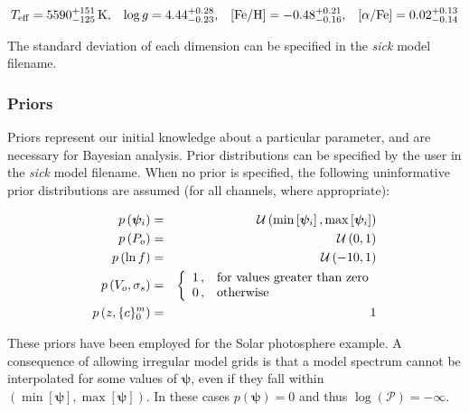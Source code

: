 \documentclass{aastex}
\newcommand{\sick}{\textit{sick}}
\begin{document}

\begin{eqnarray}
T_{\rm eff} = 5590_{-125}^{+151}\,\mbox{K},\,\,\,\,\, \log{g} = 4.44_{-0.23}^{+0.28},\,\,\,\,\, [\mbox{Fe/H}] = -0.48_{-0.16}^{+0.21},\,\,\,\,\, [\alpha/\mbox{Fe}] = 0.02_{-0.14}^{+0.13} \\
\end{eqnarray}

The standard deviation of each dimension can be specified in the \sick{} model filename.

\subsubsection{Priors}
\label{sec:priors}

Priors represent our initial knowledge about a particular parameter, and are necessary for Bayesian analysis. Prior distributions can be specified by the user in the \sick{} model filename. When no prior is specified, the following uninformative prior distributions are assumed (for all channels, where appropriate):

\begin{eqnarray}
p\left(\bm{\psi}_i\right) &=& \mathcal{U}\left(\min\left[\bm{\psi}_i\right], \max\left[\bm{\psi}_i\right]\right) \\
p\left(P_o\right) &=& \mathcal{U}\left(0, 1\right) \\
p\left(\ln{f}\right) &=& \mathcal{U}\left(-10, 1\right) \\
p\left(V_o,\sigma_s\right) &=& \left\{
\begin{array}{c l}      
    1\,, &\mbox{for values greater than zero}\\
    0\,, &\mbox{otherwise}
\end{array}\right. \\
p\left(z,\{c\}_0^{m}\right) &=& 1 \\
\label{eq:default_priors}
\end{eqnarray} 

These priors have been employed for the Solar photosphere example. A consequence of allowing irregular model grids is that a model spectrum cannot be interpolated for some values of $\bm{\psi}$, even if they fall within $\left(\min\left[\bm{\psi}\right], \max\left[\bm{\psi}\right]\right)$. In these cases $p\left(\bm{\psi}\right) = 0$ and thus $\log\left(\mathcal{P}\right) = -\infty$.

\end{document}
